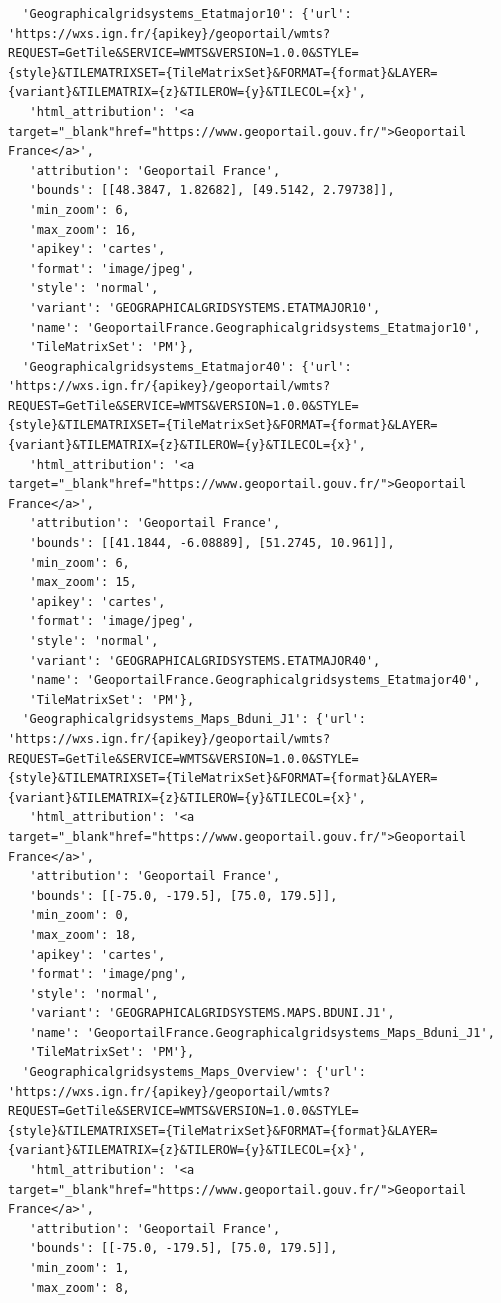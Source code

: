 \documentclass[
  letterpaper,
  DIV=11,
  numbers=noendperiod]{scrreprt}
\begin{document}
\begin{verbatim}
  'Geographicalgridsystems_Etatmajor10': {'url': 'https://wxs.ign.fr/{apikey}/geoportail/wmts?REQUEST=GetTile&SERVICE=WMTS&VERSION=1.0.0&STYLE={style}&TILEMATRIXSET={TileMatrixSet}&FORMAT={format}&LAYER={variant}&TILEMATRIX={z}&TILEROW={y}&TILECOL={x}',
   'html_attribution': '<a target="_blank"href="https://www.geoportail.gouv.fr/">Geoportail France</a>',
   'attribution': 'Geoportail France',
   'bounds': [[48.3847, 1.82682], [49.5142, 2.79738]],
   'min_zoom': 6,
   'max_zoom': 16,
   'apikey': 'cartes',
   'format': 'image/jpeg',
   'style': 'normal',
   'variant': 'GEOGRAPHICALGRIDSYSTEMS.ETATMAJOR10',
   'name': 'GeoportailFrance.Geographicalgridsystems_Etatmajor10',
   'TileMatrixSet': 'PM'},
  'Geographicalgridsystems_Etatmajor40': {'url': 'https://wxs.ign.fr/{apikey}/geoportail/wmts?REQUEST=GetTile&SERVICE=WMTS&VERSION=1.0.0&STYLE={style}&TILEMATRIXSET={TileMatrixSet}&FORMAT={format}&LAYER={variant}&TILEMATRIX={z}&TILEROW={y}&TILECOL={x}',
   'html_attribution': '<a target="_blank"href="https://www.geoportail.gouv.fr/">Geoportail France</a>',
   'attribution': 'Geoportail France',
   'bounds': [[41.1844, -6.08889], [51.2745, 10.961]],
   'min_zoom': 6,
   'max_zoom': 15,
   'apikey': 'cartes',
   'format': 'image/jpeg',
   'style': 'normal',
   'variant': 'GEOGRAPHICALGRIDSYSTEMS.ETATMAJOR40',
   'name': 'GeoportailFrance.Geographicalgridsystems_Etatmajor40',
   'TileMatrixSet': 'PM'},
  'Geographicalgridsystems_Maps_Bduni_J1': {'url': 'https://wxs.ign.fr/{apikey}/geoportail/wmts?REQUEST=GetTile&SERVICE=WMTS&VERSION=1.0.0&STYLE={style}&TILEMATRIXSET={TileMatrixSet}&FORMAT={format}&LAYER={variant}&TILEMATRIX={z}&TILEROW={y}&TILECOL={x}',
   'html_attribution': '<a target="_blank"href="https://www.geoportail.gouv.fr/">Geoportail France</a>',
   'attribution': 'Geoportail France',
   'bounds': [[-75.0, -179.5], [75.0, 179.5]],
   'min_zoom': 0,
   'max_zoom': 18,
   'apikey': 'cartes',
   'format': 'image/png',
   'style': 'normal',
   'variant': 'GEOGRAPHICALGRIDSYSTEMS.MAPS.BDUNI.J1',
   'name': 'GeoportailFrance.Geographicalgridsystems_Maps_Bduni_J1',
   'TileMatrixSet': 'PM'},
  'Geographicalgridsystems_Maps_Overview': {'url': 'https://wxs.ign.fr/{apikey}/geoportail/wmts?REQUEST=GetTile&SERVICE=WMTS&VERSION=1.0.0&STYLE={style}&TILEMATRIXSET={TileMatrixSet}&FORMAT={format}&LAYER={variant}&TILEMATRIX={z}&TILEROW={y}&TILECOL={x}',
   'html_attribution': '<a target="_blank"href="https://www.geoportail.gouv.fr/">Geoportail France</a>',
   'attribution': 'Geoportail France',
   'bounds': [[-75.0, -179.5], [75.0, 179.5]],
   'min_zoom': 1,
   'max_zoom': 8,

\end{verbatim}
\end{document}
